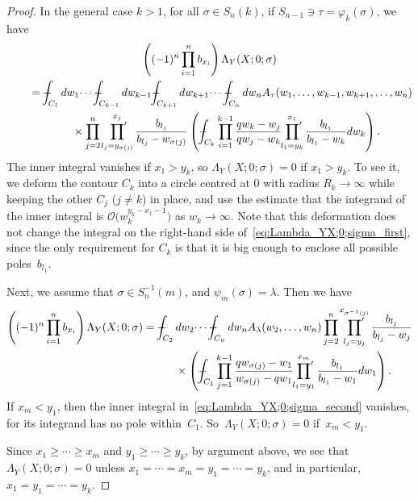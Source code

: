\documentclass[pdftex]{sigma}
\numberwithin{equation}{section}
\def\Xint#1{\mathchoice
{\XXint\displaystyle\textstyle{#1}}%
{\XXint\textstyle\scriptstyle{#1}}%
{\XXint\scriptstyle\scriptscriptstyle{#1}}%
{\XXint\scriptscriptstyle\scriptscriptstyle{#1}}%
\!\int}
\def\XXint#1#2#3{{\setbox0=\hbox{$#1{#2#3}{\int}$}
\vcenter{\hbox{$#2#3$}}\kern-.5\wd0}}
\def\dashint{\Xint-}
\newcommand{\prodprime}{\sideset{}{'}\prod}
\newcommand{\bigO}{\mathcal{O}}
\begin{document}
\begin{proof}
 In the general case $k > 1$, for all $\sigma \in S_n(k)$, if $S_{n - 1} \ni \tau = \varphi_k(\sigma)$, we have
 \begin{gather}
 \left( (-1)^n \prod^n_{i = 1} b_{x_i} \right) \Lambda_Y(X; 0; \sigma) \nonumber\\
\qquad{} = \dashint_{C_1} dw_1 \dotsi \dashint_{C_{k - 1}} dw_{k - 1} \dashint_{C_{k + 1}} dw_{k + 1} \dotsi \dashint_{C_n} dw_n A_{\tau}(w_1, \dotsc, w_{k - 1}, w_{k + 1}, \dotsc, w_n) \nonumber\\
 \qquad\quad{} \times \prod^n_{j = 2} \prodprime^{x_j}_{l_j = y_{\sigma(j)}} \frac{b_{l_j}}{b_{l_j} - w_{\sigma(j)}} \left( \dashint_{C_k} \prod^{k - 1}_{i = 1} \frac{q w_k - w_j}{q w_j - w_k} \prodprime^{x_1}_{l_1 = y_k} \frac{b_{l_1}}{b_{l_1} - w_k} dw_k \right).\label{eq:Lambda_YX;0;sigma_first}
 \end{gather}
 The inner integral vanishes if $x_1 > y_k$, so $\Lambda_Y(X; 0; \sigma) = 0$ if $x_1 > y_k$. To see it, we deform the contour $C_k$ into a circle centred at $0$ with radius $R_k \to \infty$ while keeping the other $C_j$ ($j \neq k$) in place, and use the estimate that the integrand of the inner integral is $\bigO\big(w^{y_k - x_1 - 1}_k\big)$ as $w_k \to \infty$. Note that this deformation does not change the integral on the right-hand side of~\eqref{eq:Lambda_YX;0;sigma_first}, since the only requirement for $C_k$ is that it is big enough to enclose all possible poles~$b_{l_1}$.

 Next, we assume that $\sigma \in S^{-1}_n(m)$, and $\psi_m(\sigma) = \lambda$. Then we have
 \begin{gather}
 \left( (-1)^n \prod^n_{i = 1} b_{x_i} \right) \Lambda_Y(X; 0; \sigma) = \dashint_{C_2} dw_2 \dotsi \dashint_{C_n} dw_n A_{\lambda}(w_2, \dotsc, w_n) \prod^n_{j = 2} \prodprime^{x_{\sigma^{-1}(j)}}_{l_j = y_j} \frac{b_{l_j}}{b_{l_j} - w_j}\nonumber \\
 \hphantom{\left( (-1)^n \prod^n_{i = 1} b_{x_i} \right) \Lambda_Y(X; 0; \sigma) =}{}
 \times \left( \dashint_{C_1} \prod^{k - 1}_{j = 1} \frac{q w_{\sigma(j)} - w_1}{w_{\sigma(j)} - q w_1} \prodprime^{x_m}_{l_1 = y_1} \frac{b_{l_1}}{b_{l_1} - w_1} dw_1 \right).\label{eq:Lambda_YX;0;sigma_second}
 \end{gather}
 If $x_m < y_1$, then the inner integral in~\eqref{eq:Lambda_YX;0;sigma_second} vanishes, for its integrand has no pole within~$C_1$. So~$\Lambda_Y(X; 0; \sigma) = 0$ if~$x_m < y_1$.

 Since $x_1 \geq \dotsb \geq x_m$ and $y_1 \geq \dotsb \geq y_k$, by argument above, we see that $\Lambda_Y(X; 0; \sigma) = 0$ unless $x_1 = \dotsb = x_m = y_1 = \dotsb = y_k$, and in particular, $x_1 = y_1 = \dotsb = y_k$.


\end{proof}
\end{document}
